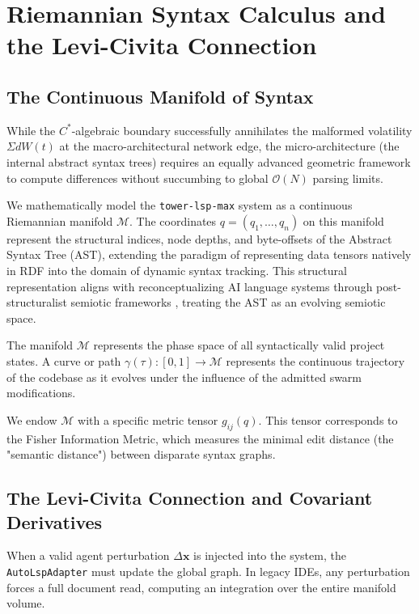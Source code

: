 \chapter{Riemannian Syntax Calculus and the Levi-Civita Connection}
\label{ch:differential_calculus}

\section{The Continuous Manifold of Syntax}

While the $C^*$-algebraic boundary successfully annihilates the malformed volatility $\Sigma dW(t)$ at the macro-architectural network edge, the micro-architecture (the internal abstract syntax trees) requires an equally advanced geometric framework to compute differences without succumbing to global $\mathcal{O}(N)$ parsing limits. 

We mathematically model the \texttt{tower-lsp-max} system as a continuous Riemannian manifold $\mathcal{M}$. The coordinates $q = (q_1, \dots, q_n)$ on this manifold represent the structural indices, node depths, and byte-offsets of the Abstract Syntax Tree (AST), extending the paradigm of representing data tensors natively in RDF \cite{tensors_rdf_sparql_2024} into the domain of dynamic syntax tracking. This structural representation aligns with reconceptualizing AI language systems through post-structuralist semiotic frameworks \cite{language_models_semiotic_2024}, treating the AST as an evolving semiotic space. 

The manifold $\mathcal{M}$ represents the phase space of all syntactically valid project states. A curve or path $\gamma(\tau) : [0, 1] \to \mathcal{M}$ represents the continuous trajectory of the codebase as it evolves under the influence of the admitted swarm modifications.

We endow $\mathcal{M}$ with a specific metric tensor $g_{ij}(q)$. This tensor corresponds to the Fisher Information Metric, which measures the minimal edit distance (the "semantic distance") between disparate syntax graphs. 

\section{The Levi-Civita Connection and Covariant Derivatives}

When a valid agent perturbation $\Delta \mathbf{x}$ is injected into the system, the \texttt{AutoLspAdapter} must update the global graph. In legacy IDEs, any perturbation forces a full document read, computing an integration over the entire manifold volume.

